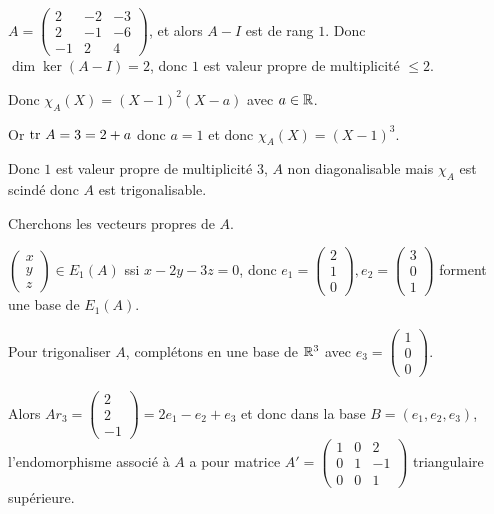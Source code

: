 \begin{exemple}
    $A = \begin{pmatrix}
        2 & -2 & -3 \\
        2 & -1 & -6 \\
        -1 & 2 & 4
    \end{pmatrix}$, et alors $A - I$ est de rang $1$. Donc $\dim \ker (A - I) = 2$, donc 
    $1$ est valeur propre de multiplicité $\leqslant 2$.

    Donc $\chi_A(X) = (X - 1)^2 (X - a)$ avec $a \in \mathbb{R}$.

    Or $\operatorname{tr} \, A = 3 = 2 + a$ donc $a = 1$ et donc $\chi_A(X) = (X - 1)^3$.

    Donc $1$ est valeur propre de multiplicité $3$, $A$ non diagonalisable
    mais $\chi_A$ est scindé donc $A$ est trigonalisable.

    \avspace Cherchons les vecteurs propres de $A$. 

    $\begin{pmatrix}
        x \\
        y \\
        z
    \end{pmatrix} \in E_1(A)$ ssi $x - 2y - 3z = 0$, donc $e_1 = \begin{pmatrix}
        2 \\
        1 \\
        0
    \end{pmatrix}, e_2 = \begin{pmatrix}
        3 \\
        0 \\
        1
    \end{pmatrix}$ forment une base de $E_1(A)$.

    Pour trigonaliser $A$, complétons en une base de $\mathbb{R}^3$ avec $e_3 = \begin{pmatrix}
        1 \\
        0 \\
        0
    \end{pmatrix}$.

    Alors $Ar_3 = \begin{pmatrix}
        2 \\
        2 \\
        -1
    \end{pmatrix} = 2 e_1 - e_2 + e_3$ 
    et donc dans la base $B = (e_1, e_2, e_3)$, l'endomorphisme associé à $A$ a pour matrice 
    $A' = \begin{pmatrix}
        1 & 0 & 2 \\
        0 & 1 & -1 \\
        0 & 0 & 1
    \end{pmatrix}$ triangulaire supérieure.
\end{exemple}



